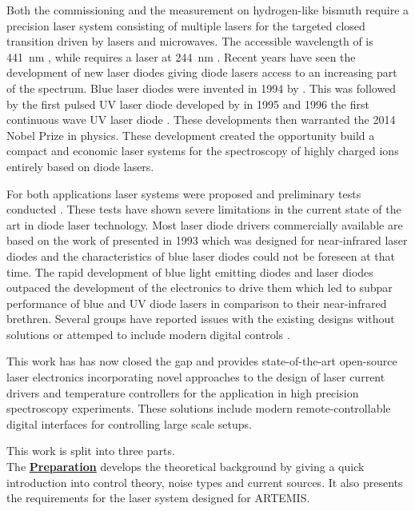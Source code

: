 Both the commissioning and the measurement on hydrogen-like bismuth require a precision laser system consisting of multiple lasers for the targeted closed transition driven by lasers and microwaves. The accessible wavelength of  is \qty{441}{\nm} \cite{ar13+_wavelength}, while  requires a laser at \qty{244}{\nm} \cite{bi82+_wavelength}. Recent years have seen the development of new laser diodes giving diode lasers access to an increasing part of the spectrum. Blue laser diodes were invented in 1994 by \citeauthor{Nakamura_1996} \cite{Nakamura_1996}. This was followed by the first pulsed UV laser diode developed by \citeauthor{uv_pulsed_laser_diode_first} \cite{uv_pulsed_laser_diode_first} in 1995 and 1996 the first continuous wave UV laser diode \cite{uv_cw_laser_diode_first}. These developments then warranted the 2014 Nobel Prize in physics. These development created the opportunity build a compact and economic laser systems for the spectroscopy of highly charged ions entirely based on diode lasers.

For both applications laser systems were proposed and preliminary tests conducted \cite{thesis_baus,thesis_alex,thesis_tilman,thesis_seppo}. These tests have shown severe limitations in the current state of the art in diode laser technology. Most laser diode drivers commercially available are based on the work of \citeauthor{libbrecht_hall} presented in 1993 \cite{libbrecht_hall} which was designed for near-infrared laser diodes and the characteristics of blue laser diodes could not be foreseen at that time. The rapid development of blue light emitting diodes and laser diodes outpaced the development of the electronics to drive them which led to subpar performance of blue and UV diode lasers in comparison to their near-infrared brethren. Several groups have reported issues with the existing designs \cite{laser_driver_mosfet_noise} without solutions or attemped to include modern digital controls \cite{laser_driver_digital}.

This work has has now closed the gap and provides state-of-the-art open-source laser electronics incorporating novel approaches to the design of laser current drivers and temperature controllers for the application in high precision spectroscopy experiments. These solutions include modern remote-controllable digital interfaces for controlling large scale setups.

This work is split into three parts.\\

The \hyperref[sec:preparation]{\textbf{Preparation}} develops the theoretical background by giving a quick introduction into control theory, noise types and current sources. It also presents the requirements for the laser system designed for ARTEMIS.\\

